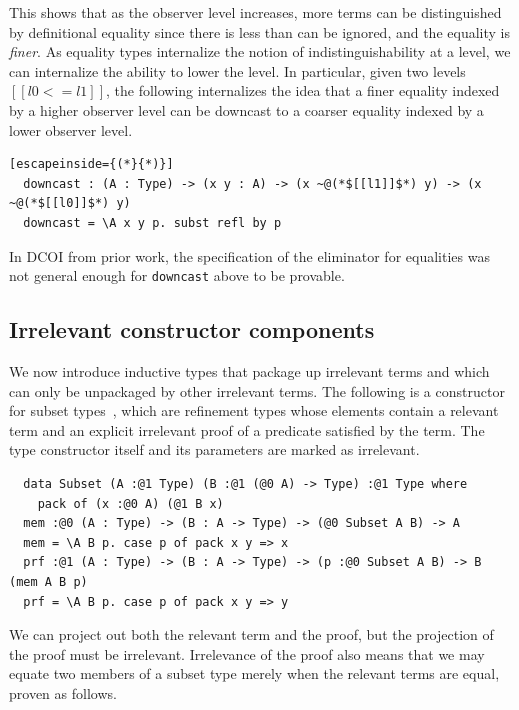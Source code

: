 \documentclass[acmsmall, screen=true, nonacm=true,
  review=\ifpublic false\else true\fi,
  anonymous=\ifanonymous true\else false\fi
]{acmart}
\makeatletter
\newcommand{\dcoi}{DCOI\@\xspace}
\makeatother
\begin{document}
This shows that as the observer level increases,
more terms can be distinguished by definitional equality
since there is less than can be ignored,
and the equality is \emph{finer}.
As equality types internalize the notion of indistinguishability at a level,
we can internalize the ability to lower the level.
In particular, given two levels $[[l0 <= l1]]$, the
following internalizes the idea that a finer equality indexed by
a higher observer level can be downcast to a coarser equality indexed by
a lower observer level.

\begin{lstlisting}[escapeinside={(*}{*)}]
  downcast : (A : Type) -> (x y : A) -> (x ~@(*$[[l1]]$*) y) -> (x ~@(*$[[l0]]$*) y)
  downcast = \A x y p. subst refl by p
\end{lstlisting}

In \dcoi from prior work,
the specification of the eliminator for equalities was not general enough
for \lstinline{downcast} above to be provable.


\subsection{Irrelevant constructor components}

We now introduce inductive types
that package up irrelevant terms
and which can only be unpackaged by other irrelevant terms.
The following is a constructor for subset types~\citep{constable:nuprl},
which are refinement types whose elements
contain a relevant term and an explicit irrelevant proof
of a predicate satisfied by the term.
The type constructor itself and its parameters are marked as irrelevant.

\begin{lstlisting}
  data Subset (A :@1 Type) (B :@1 (@0 A) -> Type) :@1 Type where
    pack of (x :@0 A) (@1 B x)
  mem :@0 (A : Type) -> (B : A -> Type) -> (@0 Subset A B) -> A
  mem = \A B p. case p of pack x y => x
  prf :@1 (A : Type) -> (B : A -> Type) -> (p :@0 Subset A B) -> B (mem A B p)
  prf = \A B p. case p of pack x y => y
\end{lstlisting}

We can project out both the relevant term and the proof,
but the projection of the proof must be irrelevant.
Irrelevance of the proof also means that we may equate
two members of a subset type merely when the relevant terms are equal,
proven as follows.
\end{document}
